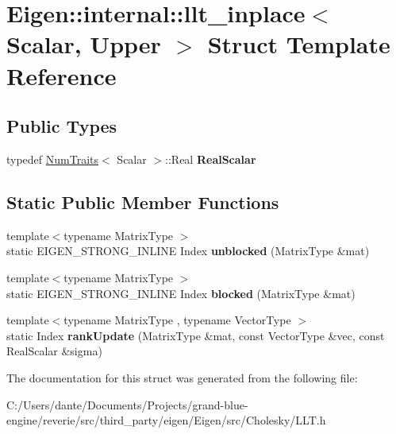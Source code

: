 \hypertarget{struct_eigen_1_1internal_1_1llt__inplace_3_01_scalar_00_01_upper_01_4}{}\section{Eigen\+::internal\+::llt\+\_\+inplace$<$ Scalar, Upper $>$ Struct Template Reference}
\label{struct_eigen_1_1internal_1_1llt__inplace_3_01_scalar_00_01_upper_01_4}
\subsection*{Public Types}
\begin{DoxyCompactItemize}
\item 
\mbox{\label{struct_eigen_1_1internal_1_1llt__inplace_3_01_scalar_00_01_upper_01_4_a5c0b84554aa27313036184c02fac2718}} 
typedef \mbox{\hyperlink{struct_eigen_1_1_num_traits}{Num\+Traits}}$<$ Scalar $>$\+::Real {\bfseries Real\+Scalar}
\end{DoxyCompactItemize}
\subsection*{Static Public Member Functions}
\begin{DoxyCompactItemize}
\item 
\mbox{\label{struct_eigen_1_1internal_1_1llt__inplace_3_01_scalar_00_01_upper_01_4_a463cfb3c179e758d90d60a2922d6ce56}} 
{\footnotesize template$<$typename Matrix\+Type $>$ }\\static E\+I\+G\+E\+N\+\_\+\+S\+T\+R\+O\+N\+G\+\_\+\+I\+N\+L\+I\+NE Index {\bfseries unblocked} (Matrix\+Type \&mat)
\item 
\mbox{\label{struct_eigen_1_1internal_1_1llt__inplace_3_01_scalar_00_01_upper_01_4_a9d0bd12c1bf77e80e6d6d6b32fb19989}} 
{\footnotesize template$<$typename Matrix\+Type $>$ }\\static E\+I\+G\+E\+N\+\_\+\+S\+T\+R\+O\+N\+G\+\_\+\+I\+N\+L\+I\+NE Index {\bfseries blocked} (Matrix\+Type \&mat)
\item 
\mbox{\label{struct_eigen_1_1internal_1_1llt__inplace_3_01_scalar_00_01_upper_01_4_ab044cd63f44a77c7638ac58b772cec43}} 
{\footnotesize template$<$typename Matrix\+Type , typename Vector\+Type $>$ }\\static Index {\bfseries rank\+Update} (Matrix\+Type \&mat, const Vector\+Type \&vec, const Real\+Scalar \&sigma)
\end{DoxyCompactItemize}


The documentation for this struct was generated from the following file\+:\begin{DoxyCompactItemize}
\item 
C\+:/\+Users/dante/\+Documents/\+Projects/grand-\/blue-\/engine/reverie/src/third\+\_\+party/eigen/\+Eigen/src/\+Cholesky/L\+L\+T.\+h\end{DoxyCompactItemize}
